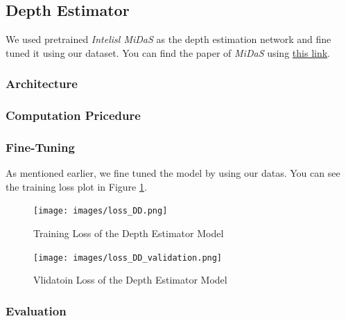 \documentclass[a4paper, openany]{book}
\begin{document}
	
\newpage

\subsection{Depth Estimator}
	\vspace{0.3cm}

We used pretrained \textit{Intelisl MiDaS} as the depth estimation network and fine tuned it using our dataset. You can find the paper of \textit{MiDaS} using \href{https://arxiv.org/abs/1907.01341}{this link}.


\subsubsection{Architecture}
	\vspace{0.3cm}

\subsubsection{Computation Pricedure}
	\vspace{0.3cm}
	
	
\newpage

\subsubsection{Fine-Tuning}
	\vspace{0.3cm}



As mentioned earlier, we fine tuned the model by using our datas. You can see the training loss plot in Figure \ref{fig:loss_DD}.

\begin{figure}[ht]
  \centering
    \texttt{[image: images/loss\_DD.png]}
      \caption{Training Loss of the Depth Estimator Model}
  \label{fig:loss_DD}
\end{figure}

\begin{figure}[ht]
  \centering
    \texttt{[image: images/loss\_DD\_validation.png]}
      \caption{Vlidatoin Loss of the Depth Estimator Model}
  \label{fig:loss_DD_validation}
\end{figure}

	
\subsubsection{Evaluation}
	\vspace{0.3cm}
	
\end{document}

